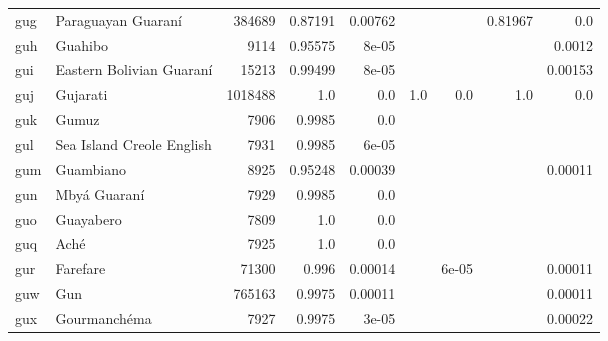 \documentclass[11pt]{article}
\begin{document}
\begin{table*}[h]
{\begin{tabular}{llrrrrrrr}
gug         & Paraguayan Guaraní         & 384689         & 0.87191         & 0.00762         &          &          & 0.81967         & 0.0         \\

guh         & Guahibo         & 9114         & 0.95575         & 8e-05         &          &          &          & 0.0012         \\

gui         & Eastern Bolivian Guaraní         & 15213         & 0.99499         & 8e-05         &          &          &          & 0.00153         \\

guj         & Gujarati         & 1018488         & 1.0         & 0.0         & 1.0         & 0.0         & 1.0         & 0.0         \\

guk         & Gumuz         & 7906         & 0.9985         & 0.0         &          &          &          &          \\

gul         & Sea Island Creole English         & 7931         & 0.9985         & 6e-05         &          &          &          &          \\

gum         & Guambiano         & 8925         & 0.95248         & 0.00039         &          &          &          & 0.00011         \\

gun         & Mbyá Guaraní         & 7929         & 0.9985         & 0.0         &          &          &          &          \\

guo         & Guayabero         & 7809         & 1.0         & 0.0         &          &          &          &          \\

guq         & Aché         & 7925         & 1.0         & 0.0         &          &          &          &          \\

gur         & Farefare         & 71300         & 0.996         & 0.00014         &          & 6e-05         &          & 0.00011         \\

guw         & Gun         & 765163         & 0.9975         & 0.00011         &          &          &          & 0.00011         \\

gux         & Gourmanchéma         & 7927         & 0.9975         & 3e-05         &          &          &          & 0.00022         \\


\end{tabular}}
\end{table*}
\end{document}
